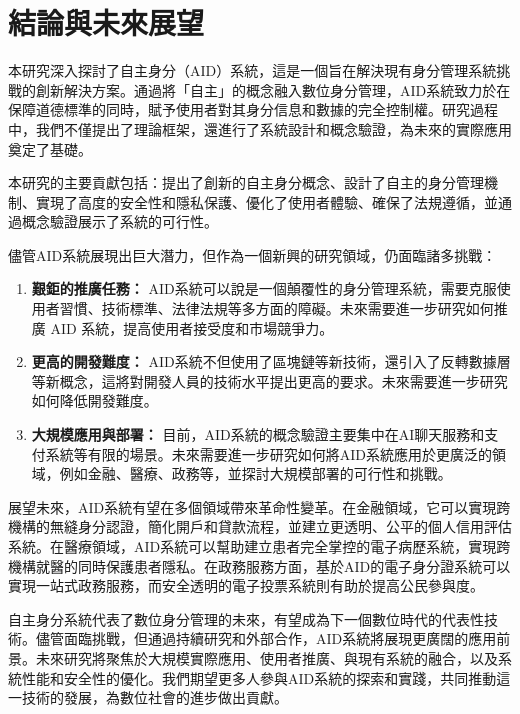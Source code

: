 
\chapter{結論與未來展望}
本研究深入探討了自主身分（AID）系統，這是一個旨在解決現有身分管理系統挑戰的創新解決方案。通過將「自主」的概念融入數位身分管理，AID系統致力於在保障道德標準的同時，賦予使用者對其身分信息和數據的完全控制權。研究過程中，我們不僅提出了理論框架，還進行了系統設計和概念驗證，為未來的實際應用奠定了基礎。

本研究的主要貢獻包括：提出了創新的自主身分概念、設計了自主的身分管理機制、實現了高度的安全性和隱私保護、優化了使用者體驗、確保了法規遵循，並通過概念驗證展示了系統的可行性。

儘管AID系統展現出巨大潛力，但作為一個新興的研究領域，仍面臨諸多挑戰：
\begin{enumerate}
    \item \textbf{艱鉅的推廣任務：} AID系統可以說是一個顛覆性的身分管理系統，需要克服使用者習慣、技術標準、法律法規等多方面的障礙。未來需要進一步研究如何推廣 AID 系統，提高使用者接受度和市場競爭力。
    \item \textbf{更高的開發難度：} AID系統不但使用了區塊鏈等新技術，還引入了反轉數據層等新概念，這將對開發人員的技術水平提出更高的要求。未來需要進一步研究如何降低開發難度。
    \item \textbf{大規模應用與部署：} 目前，AID系統的概念驗證主要集中在AI聊天服務和支付系統等有限的場景。未來需要進一步研究如何將AID系統應用於更廣泛的領域，例如金融、醫療、政務等，並探討大規模部署的可行性和挑戰。
\end{enumerate}

展望未來，AID系統有望在多個領域帶來革命性變革。在金融領域，它可以實現跨機構的無縫身分認證，簡化開戶和貸款流程，並建立更透明、公平的個人信用評估系統。在醫療領域，AID系統可以幫助建立患者完全掌控的電子病歷系統，實現跨機構就醫的同時保護患者隱私。在政務服務方面，基於AID的電子身分證系統可以實現一站式政務服務，而安全透明的電子投票系統則有助於提高公民參與度。

自主身分系統代表了數位身分管理的未來，有望成為下一個數位時代的代表性技術。儘管面臨挑戰，但通過持續研究和外部合作，AID系統將展現更廣闊的應用前景。未來研究將聚焦於大規模實際應用、使用者推廣、與現有系統的融合，以及系統性能和安全性的優化。我們期望更多人參與AID系統的探索和實踐，共同推動這一技術的發展，為數位社會的進步做出貢獻。